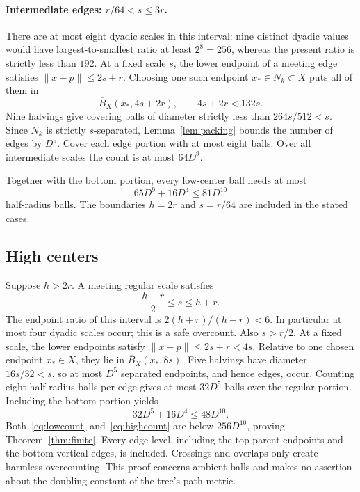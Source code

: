 \documentclass[11pt,a4paper]{article}
\theoremstyle{definition}
\theoremstyle{remark}
\numberwithin{equation}{section}
\newcommand{\norm}[1]{\lVert #1\rVert}
\newcommand{\cB}{\overline B}
\begin{document}
\paragraph{Intermediate edges: $r/64<s\le3r$.}
There are at most eight dyadic scales in this interval: nine distinct dyadic values would have largest-to-smallest ratio at least $2^8=256$, whereas the present ratio is strictly less than $192$.
At a fixed scale $s$, the lower endpoint of a meeting edge satisfies $\norm{x-p}\le2s+r$. Choosing one such endpoint $x_*\in N_k\subset X$ puts all of them in
\[
 \cB_X(x_*,4s+2r),\qquad 4s+2r<132s.
\]
Nine halvings give covering balls of diameter strictly less than $264s/512<s$. Since $N_k$ is strictly $s$-separated, Lemma~\ref{lem:packing} bounds the number of edges by $D^9$. Cover each edge portion with at most eight balls. Over all intermediate scales the count is at most $64D^9$.

Together with the bottom portion, every low-center ball needs at most
\begin{equation}\label{eq:lowcount}
 65D^9+16D^4\le81D^{10}
\end{equation}
half-radius balls. The boundaries $h=2r$ and $s=r/64$ are included in the stated cases.

\subsection{High centers}
Suppose $h>2r$. A meeting regular scale satisfies
\begin{equation}\label{eq:highwindow}
 \frac{h-r}{2}\le s\le h+r.
\end{equation}
The endpoint ratio of this interval is $2(h+r)/(h-r)<6$. In particular at most four dyadic scales occur; this is a safe overcount. Also $s>r/2$.
At a fixed scale, the lower endpoints satisfy $\norm{x-p}\le2s+r<4s$. Relative to one chosen endpoint $x_*\in X$, they lie in $\cB_X(x_*,8s)$. Five halvings have diameter $16s/32<s$, so at most $D^5$ separated endpoints, and hence edges, occur. Counting eight half-radius balls per edge gives at most $32D^5$ balls over the regular portion. Including the bottom portion yields
\begin{equation}\label{eq:highcount}
 32D^5+16D^4\le48D^{10}.
\end{equation}
Both~\eqref{eq:lowcount} and~\eqref{eq:highcount} are below $256D^{10}$, proving Theorem~\ref{thm:finite}. Every edge level, including the top parent endpoints and the bottom vertical edges, is included. Crossings and overlaps only create harmless overcounting. This proof concerns ambient balls and makes no assertion about the doubling constant of the tree's path metric.
\end{document}
